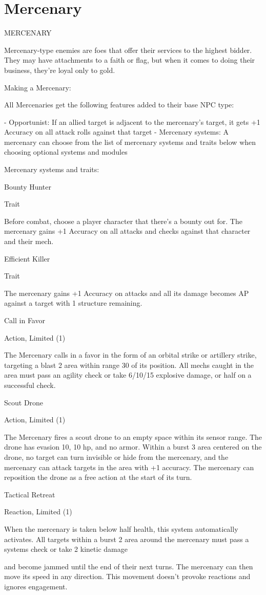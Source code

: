 \section{Mercenary}
                                                MERCENARY

Mercenary-type enemies are foes that offer their services to the highest bidder. They may have
attachments to a faith or flag, but when it comes to doing their business, they’re loyal only to
gold.


Making a Mercenary:

All Mercenaries get the following features added to their base NPC type:

     -   Opportunist: If an allied target is adjacent to the mercenary’s target, it gets +1 Accuracy
         on all attack rolls against that target
     -   Mercenary systems: A mercenary can choose from the list of mercenary systems and
         traits below when choosing optional systems and modules

Mercenary systems and traits:

Bounty Hunter

Trait

Before combat, choose a player character that there’s a bounty out for. The mercenary gains +1
Accuracy on all attacks and checks against that character and their mech.


Efficient Killer

Trait

The mercenary gains +1 Accuracy on attacks and all its damage becomes AP against a target
with 1 structure remaining.


Call in Favor

Action, Limited (1)

The Mercenary calls in a favor in the form of an orbital strike or artillery strike, targeting a blast 2
area within range 30 of its position. All mechs caught in the area must pass an agility check or
take 6/10/15 explosive damage, or half on a successful check.


Scout Drone

Action, Limited (1)

The Mercenary fires a scout drone to an empty space within its sensor range. The drone has
evasion 10, 10 hp, and no armor. Within a burst 3 area centered on the drone, no target can turn
invisible or hide from the mercenary, and the mercenary can attack targets in the area with +1
accuracy. The mercenary can reposition the drone as a free action at the start of its turn.


Tactical Retreat

Reaction, Limited (1)

When the mercenary is taken below half health, this system automatically activates. All targets
within a burst 2 area around the mercenary must pass a systems check or take 2 kinetic damage




and become jammed until the end of their next turns. The mercenary can then move its speed in
any direction. This movement doesn't provoke reactions and ignores engagement.
